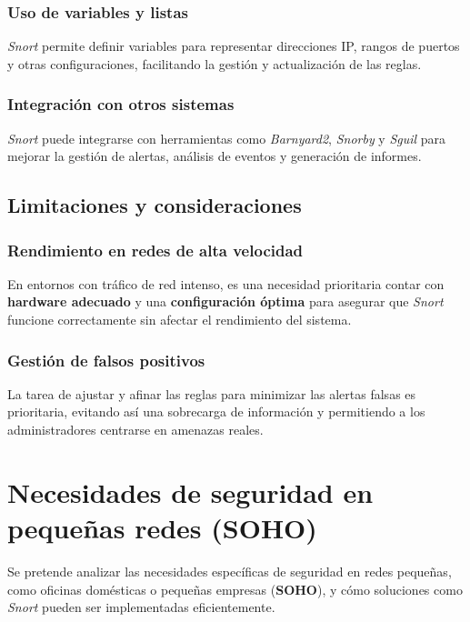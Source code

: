 \documentclass[11pt,a4paper,twoside]{report}
\begin{document}
\subsubsection{Uso de variables y listas}

\textit{Snort} permite definir variables para representar direcciones IP, rangos de puertos y otras configuraciones, facilitando la gestión y actualización de las reglas.

\subsubsection{Integración con otros sistemas}

\textit{Snort} puede integrarse con herramientas como \textit{Barnyard2}, \textit{Snorby} y \textit{Sguil} para mejorar la gestión de alertas, análisis de eventos y generación de informes.

\subsection{Limitaciones y consideraciones}

\subsubsection{Rendimiento en redes de alta velocidad}

En entornos con tráfico de red intenso, es una necesidad prioritaria contar con \textbf{hardware adecuado} y una \textbf{configuración óptima} para asegurar que \textit{Snort} funcione correctamente sin afectar el rendimiento del sistema.

\subsubsection{Gestión de falsos positivos}

La tarea de ajustar y afinar las reglas para minimizar las alertas falsas es prioritaria, evitando así una sobrecarga de información y permitiendo a los administradores centrarse en amenazas reales.

\section{Necesidades de seguridad en pequeñas redes (SOHO)}

Se pretende analizar las necesidades específicas de seguridad en redes pequeñas, como oficinas domésticas o pequeñas empresas (\textbf{SOHO}), y cómo soluciones como \textit{Snort} pueden ser implementadas eficientemente.\newline
\end{document}
